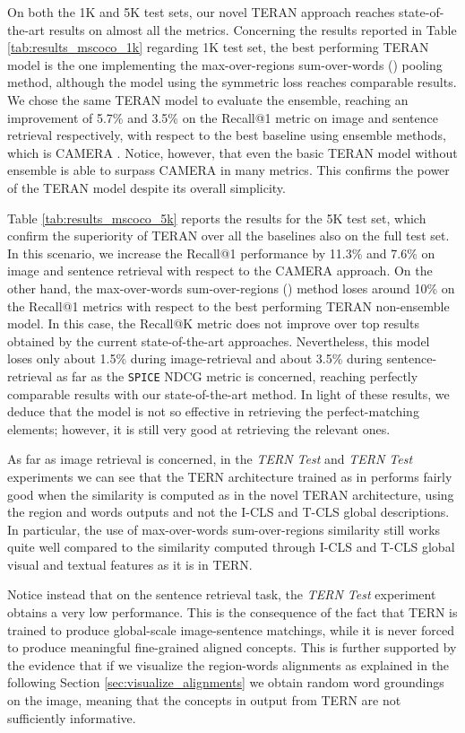 \documentclass[acmsmall]{acmart}
\newcommand{\majorrevised}[1]{#1}
\begin{document}
\majorrevised{
On both the 1K and 5K test sets, our novel TERAN approach reaches state-of-the-art results on almost all the metrics.
Concerning the results reported in Table \ref{tab:results_mscoco_1k} regarding 1K test set, the best performing TERAN model is the one implementing the max-over-regions sum-over-words () pooling method, although the model using the symmetric loss reaches comparable results. We chose the same TERAN  model to evaluate the ensemble, reaching an improvement of 5.7\% and 3.5\% on the Recall@1 metric on image and sentence retrieval respectively, with respect to the best baseline using ensemble methods, which is CAMERA \cite{qu2020context}. Notice, however, that even the basic TERAN model without ensemble is able to surpass CAMERA in many metrics. This confirms the power of the TERAN model despite its overall simplicity.

Table \ref{tab:results_mscoco_5k} reports the results for the 5K test set, which confirm the superiority of TERAN  over all the baselines also on the full test set. In this scenario, we increase the Recall@1 performance by 11.3\% and 7.6\% on image and sentence retrieval with respect to the CAMERA approach.}
On the other hand, the max-over-words sum-over-regions () method loses around 10\% on the Recall@1 metrics with respect to the best performing TERAN non-ensemble model. In this case, the Recall@K metric does not improve over top results obtained by the current state-of-the-art approaches. Nevertheless, this model loses only about 1.5\% during image-retrieval and about 3.5\% during sentence-retrieval as far as the \texttt{SPICE} NDCG metric is concerned, reaching perfectly comparable results with our state-of-the-art method.
In light of these results, we deduce that the  model is not so effective in retrieving the perfect-matching elements; however, it is still very good at retrieving the relevant ones.

As far as image retrieval is concerned, in the \textit{TERN Test} and \textit{TERN Test} experiments we can see that the TERN architecture trained as in \cite{messina2020tern} performs fairly good when the similarity is computed as in the novel TERAN architecture, using the region and words outputs and not the I-CLS and T-CLS global descriptions. In particular, the use of max-over-words sum-over-regions similarity still works quite well compared to the similarity computed through I-CLS and T-CLS global visual and textual features as it is in TERN.

Notice instead that on the sentence retrieval task, the \textit{TERN  Test} experiment obtains a very low performance. This is the consequence of the fact that TERN is trained to produce global-scale image-sentence matchings, while it is never forced to produce meaningful fine-grained aligned concepts. This is further supported by the evidence that if we visualize the region-words alignments as explained in the following Section \ref{sec:visualize_alignments} we obtain random word groundings on the image, meaning that the concepts in output from TERN are not sufficiently informative.
\end{document}
